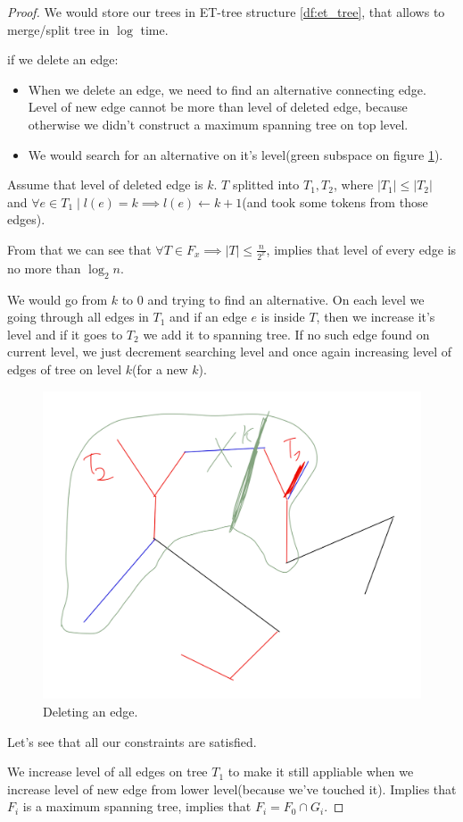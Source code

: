 \begin{proof}
We would store our trees in ET-tree structure \ref{df:et_tree}, that allows to merge/split tree in $\log$ time.

if we delete an edge:
\begin{itemize}
	\item When we delete an edge, we need to find an alternative connecting edge. Level of new edge cannot be more than level of deleted edge, because otherwise we didn't construct a maximum spanning tree on top level.
	\item We would search for an alternative on it's level(green subspace on figure \ref{fig:connectivity_deleting_spanning}). 
\end{itemize}
Assume that level of deleted edge is $k$.
$T$ splitted into $T_1, T_2$, where $|T_1| \leq |T_2|$ and $\forall e \in T_1 \mid l(e) = k \implies l(e) \gets k + 1$(and took some tokens from those edges).

From that we can see that $\forall T \in F_x \implies |T| \leq \frac{n}{2^{x}}$, implies that level of every edge is no more than $\log_2 n$.

We would go from $k$ to $0$ and trying to find an alternative.
On each level we going through all edges in $T_1$ and if an edge $e$ is inside $T$, then we increase it's level and if it goes to $T_2$ we add it to spanning tree.
If no such edge found on current level, we just decrement searching level and once again increasing level of edges of tree on level $k$(for a new $k$).

\begin{figure}[H]
	\centering
	\includegraphics[width=0.5\linewidth]{figures/connectivity_deleting_spanning.jpeg}
	\caption{Deleting an edge.}
	\label{fig:connectivity_deleting_spanning}
\end{figure}

Let's see that all our constraints are satisfied.

We increase level of all edges on tree $T_1$ to make it still appliable when we increase level of new edge from lower level(because we've touched it). Implies that $F_i$ is a maximum spanning tree, implies that $F_i = F_0 \cap G_i$.


\end{proof}
